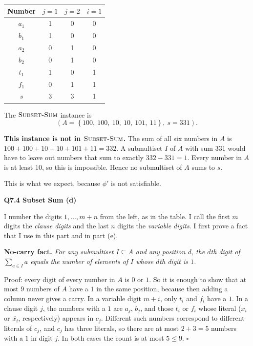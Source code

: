 \documentclass[11pt]{article}
\newcommand{\set}[1]{\left\{#1\right\}}
\newcommand{\cproblem}[1]{\textsc{#1}}
\newcommand{\SSUM}{\cproblem{Subset-Sum}}
\newcommand{\qpage}[1]{\clearpage\noindent\textbf{\large #1}\par\medskip}
\begin{document}
\begin{center}
  \begin{tabular}{| c || c | c | c |}
    \hline
    Number & $j=1$ & $j=2$ & $i=1$ \\ \hline \hline
    $a_1$ & 1 & 0 & 0 \\ \hline
    $b_1$ & 1 & 0 & 0 \\ \hline
    $a_2$ & 0 & 1 & 0 \\ \hline
    $b_2$ & 0 & 1 & 0 \\ \hline \hline
    $t_1$ & 1 & 0 & 1 \\ \hline
    $f_1$ & 0 & 1 & 1 \\ \hline \hline \hline
    $s$   & 3 & 3 & 1 \\ \hline
  \end{tabular}
\end{center}

The $\SSUM$ instance is
\[
  (A = \set{100,\ 100,\ 10,\ 10,\ 101,\ 11}, \ s = 331).
\]

\textbf{This instance is not in $\SSUM$.}
The sum of all six numbers in $A$ is $100 + 100 + 10 + 10 + 101 + 11 = 332$.
A submultiset $I$ of $A$ with sum $331$ would have to leave out numbers that sum to exactly $332 - 331 = 1$.
Every number in $A$ is at least $10$, so this is impossible.
Hence no submultiset of $A$ sums to $s$.

This is what we expect, because $\phi'$ is not satisfiable.

\qpage{Q7.4 Subset Sum (d)}

I number the digits $1, \ldots, m + n$ from the left, as in the table. I call the first $m$ digits the \emph{clause digits} and the last $n$ digits the \emph{variable digits}.
I first prove a fact that I use in this part and in part (e).

\textbf{No-carry fact.}
\emph{For any submultiset $I \subseteq A$ and any position $d$, the $d$th digit of $\sum_{a \in I} a$ equals the number of elements of $I$ whose $d$th digit is $1$.}

Proof: every digit of every number in $A$ is $0$ or $1$. So it is enough to show that at most $9$ numbers of $A$ have a $1$ in the same position, because then adding a column never gives a carry.
In a variable digit $m + i$, only $t_i$ and $f_i$ have a $1$.
In a clause digit $j$, the numbers with a $1$ are $a_j$, $b_j$, and those $t_i$ or $f_i$ whose literal ($x_i$ or $\overline{x_i}$, respectively) appears in $c_j$.
Different such numbers correspond to different literals of $c_j$, and $c_j$ has three literals, so there are at most $2 + 3 = 5$ numbers with a $1$ in digit $j$.
In both cases the count is at most $5 \leq 9$. \hfill $\square$
\end{document}
